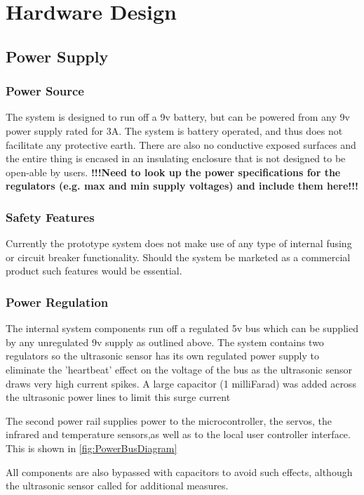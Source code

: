 \documentclass[]{report}
\begin{document}
\section{Hardware Design}
\subsection{Power Supply}
\subsubsection{Power Source}

The system is designed to run off a 9v battery, but can be powered from any 9v power supply rated for 3A. The system is battery operated, and thus does not facilitate any protective earth. There are also no conductive exposed surfaces and the entire thing is encased in an insulating enclosure that is not designed to be open-able by users. \newline
\textbf{!!!Need to look up the power specifications for the regulators (e.g. max and min supply voltages) and include them here!!!}

\subsubsection{Safety Features}
Currently the prototype system does not make use of any type of internal fusing or circuit breaker functionality. Should the system be marketed as a commercial product such features would be essential.

\subsubsection{Power Regulation}
The internal system components run off a regulated 5v bus which can be supplied by any unregulated 9v supply as outlined above. The system contains two regulators so the ultrasonic sensor has its own regulated power supply to eliminate the 'heartbeat' effect on the voltage of the bus as the ultrasonic sensor draws very high current spikes.  A large capacitor (1 milliFarad) was added across the ultrasonic power lines to limit this surge current \newline

The second power rail supplies power to the microcontroller, the servos, the infrared and temperature sensors,as well as to the local user controller interface. This is shown in \ref{fig:PowerBusDiagram}

All components are also bypassed with capacitors to avoid such effects, although the ultrasonic sensor called for additional measures.
\end{document}

